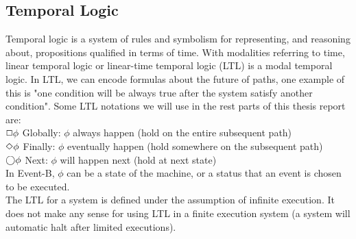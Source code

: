 \subsection{Temporal Logic}

Temporal logic is a system of rules and symbolism for representing, and reasoning about, propositions qualified in terms of time. With modalities referring to time, linear temporal logic or linear-time temporal logic (LTL) is a modal temporal logic. In LTL, we can encode formulas about the future of paths, one example of this is "one condition will be always true after the system satisfy another condition". Some LTL notations we will use in the rest parts of this thesis report are:\\
$\Box\phi$	Globally: $\phi$ always happen (hold on the entire subsequent path)\\
$\Diamond\phi$	Finally: $\phi$ eventually happen (hold somewhere on the subsequent path)\\
$\bigcirc\phi$	Next: $\phi$ will happen next (hold at next state)\\
In Event-B, $\phi$ can be a state of the machine, or a status that an event is chosen to be executed.\\
The LTL for a system is defined under the assumption of infinite execution. It does not make any sense for using LTL in a finite execution system (a system will automatic halt after limited executions).\\

